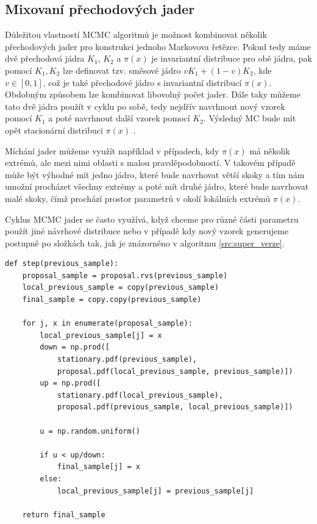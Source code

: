 \documentclass[czech,master,public,dept470,male,cpdeclaration,oneside, python]{diploma}
\begin{document}
\subsection{Mixovaní přechodových jader}
Důležitou vlastností MCMC algoritmů je možnost kombinovat několik přechodových jader pro konstrukci jednoho Markovova řetězce. Pokud tedy máme dvě přechodová jádra $K_1$, $K_2$ a $\pi(x)$ je invariantní distribuce pro obě jádra, pak pomocí $K_1,K_2$ lze definovat tzv. směsové jádro $vK_1 + (1-v)K_2$, kde $v \in [0,1]$, což je také přechodové jádro s invariantní distribucí $\pi(x)$. Obdobným způsobem lze kombinovat libovolný počet jader. Dále taky můžeme tato dvě jádra použít v cyklu po sobě, tedy nejdřív navrhnout nový vzorek pomocí $K_1$ a poté navrhnout další vzorek pomocí $K_2$. Výsledný MC bude mít opět stacionární distribuci $\pi(x)$ \cite{andrieu2003introduction}.
 \par
Míchání jader můžeme využít například v případech, kdy $\pi(x)$ má několik extrémů, ale mezi nimi oblasti s malou pravděpodobností. V takovém případě může být výhodné mít jedno jádro, které bude navrhovat větší skoky a tím nám umožní procházet všechny extrémy a poté mít druhé jádro, které bude navrhovat malé skoky, čímž prochází prostor parametrů v okolí lokálních extrémů $\pi(x)$.  
\par
Cyklus MCMC jader se často využívá, když chceme pro různé části parametru použít jiné návrhové distribuce nebo v případě kdy nový vzorek generujeme postupně po složkách tak, jak je  znázorněno v algoritmu \ref{src:super_verze}.

\begin{lstlisting}[label=src:super_verze,caption=Cyklus MH]
def step(previous_sample):
	proposal_sample = proposal.rvs(previous_sample)
	local_previous_sample = copy(previous_sample)
	final_sample = copy.copy(previous_sample)

	for j, x in enumerate(proposal_sample):
		local_previous_sample[j] = x
		down = np.prod([
			stationary.pdf(previous_sample),
			proposal.pdf(local_previous_sample, previous_sample)])
		up = np.prod([
			stationary.pdf(local_previous_sample),
			proposal.pdf(previous_sample, local_previous_sample)])

		u = np.random.uniform()

		if u < up/down:
			final_sample[j] = x
		else:
			local_previous_sample[j] = previous_sample[j]

	return final_sample
\end{lstlisting}
\end{document}
